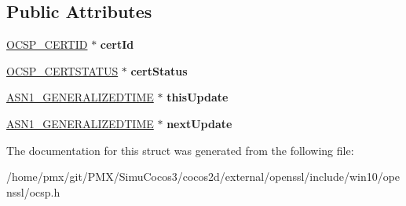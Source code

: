 \subsection*{Public Attributes}
\begin{DoxyCompactItemize}
\item 
\mbox{\label{structocsp__single__response__st_af26393e48e4a9f18955ec0b1785961fb}} 
\hyperlink{structocsp__cert__id__st}{O\+C\+S\+P\+\_\+\+C\+E\+R\+T\+ID} $\ast$ {\bfseries cert\+Id}
\item 
\mbox{\label{structocsp__single__response__st_a2d8ac66aea93406dbf48c722c8f2d185}} 
\hyperlink{structocsp__cert__status__st}{O\+C\+S\+P\+\_\+\+C\+E\+R\+T\+S\+T\+A\+T\+US} $\ast$ {\bfseries cert\+Status}
\item 
\mbox{\label{structocsp__single__response__st_a1ed7424e4d254f4af8499303dce9ffb2}} 
\hyperlink{structasn1__string__st}{A\+S\+N1\+\_\+\+G\+E\+N\+E\+R\+A\+L\+I\+Z\+E\+D\+T\+I\+ME} $\ast$ {\bfseries this\+Update}
\item 
\mbox{\label{structocsp__single__response__st_a54c06d485bae1de66d1e0b58403b2e25}} 
\hyperlink{structasn1__string__st}{A\+S\+N1\+\_\+\+G\+E\+N\+E\+R\+A\+L\+I\+Z\+E\+D\+T\+I\+ME} $\ast$ {\bfseries next\+Update}
\end{DoxyCompactItemize}


The documentation for this struct was generated from the following file\+:\begin{DoxyCompactItemize}
\item 
/home/pmx/git/\+P\+M\+X/\+Simu\+Cocos3/cocos2d/external/openssl/include/win10/openssl/ocsp.\+h\end{DoxyCompactItemize}
